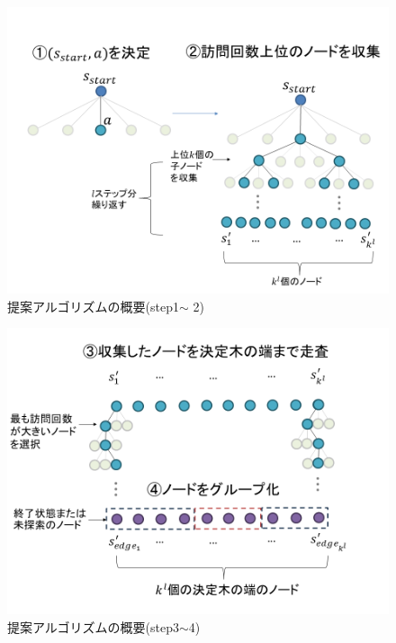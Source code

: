 \begin{enumerate}
\end{enumerate}


\begin{figure}[t]
    \centering
    \includegraphics[width=\linewidth]{./figure/1-2.png}
    \caption{提案アルゴリズムの概要(step1$\sim$ 2)}
    \label{fig:step1-2}
\end{figure}
\begin{figure}[t]
    \centering
    \includegraphics[width=\linewidth]{./figure/3-4.png}
    \caption{提案アルゴリズムの概要(step3$\sim $4)}
    \label{fig:step3-4}
\end{figure}
